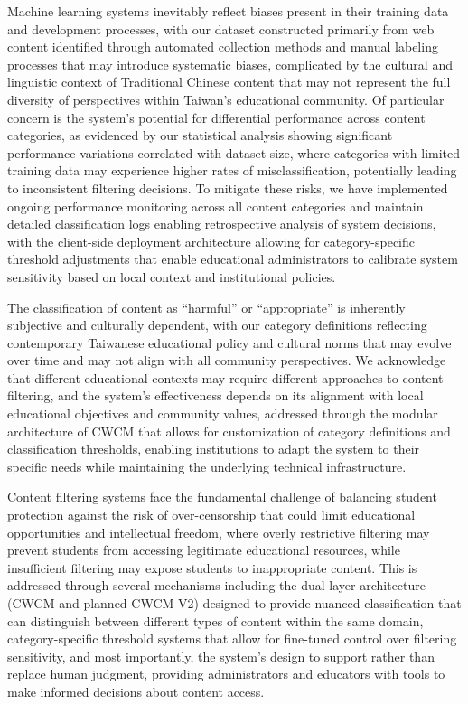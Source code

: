 \documentclass[
  titlepage]{article}
\begin{document}
Machine learning systems inevitably reflect biases present in their
training data and development processes, with our dataset constructed
primarily from web content identified through automated collection
methods and manual labeling processes that may introduce systematic
biases, complicated by the cultural and linguistic context of
Traditional Chinese content that may not represent the full diversity of
perspectives within Taiwan's educational community. Of particular
concern is the system's potential for differential performance across
content categories, as evidenced by our statistical analysis showing
significant performance variations correlated with dataset size, where
categories with limited training data may experience higher rates of
misclassification, potentially leading to inconsistent filtering
decisions. To mitigate these risks, we have implemented ongoing
performance monitoring across all content categories and maintain
detailed classification logs enabling retrospective analysis of system
decisions, with the client-side deployment architecture allowing for
category-specific threshold adjustments that enable educational
administrators to calibrate system sensitivity based on local context
and institutional policies.

The classification of content as ``harmful'' or ``appropriate'' is
inherently subjective and culturally dependent, with our category
definitions reflecting contemporary Taiwanese educational policy and
cultural norms that may evolve over time and may not align with all
community perspectives. We acknowledge that different educational
contexts may require different approaches to content filtering, and the
system's effectiveness depends on its alignment with local educational
objectives and community values, addressed through the modular
architecture of CWCM that allows for customization of category
definitions and classification thresholds, enabling institutions to
adapt the system to their specific needs while maintaining the
underlying technical infrastructure.

Content filtering systems face the fundamental challenge of balancing
student protection against the risk of over-censorship that could limit
educational opportunities and intellectual freedom, where overly
restrictive filtering may prevent students from accessing legitimate
educational resources, while insufficient filtering may expose students
to inappropriate content. This is addressed through several mechanisms
including the dual-layer architecture (CWCM and planned CWCM-V2)
designed to provide nuanced classification that can distinguish between
different types of content within the same domain, category-specific
threshold systems that allow for fine-tuned control over filtering
sensitivity, and most importantly, the system's design to support rather
than replace human judgment, providing administrators and educators with
tools to make informed decisions about content access.
\end{document}
